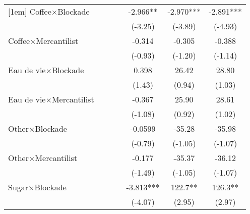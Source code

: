 {\begin{tabular}{l*{6}{c}}
[1em]
Coffee$\times$Blockade&                     &                     &                     &      -2.966** &      -2.970***&      -2.891***\\
                    &                     &                     &                     &     (-3.25)         &     (-3.89)         &     (-4.93)         \\
[1em]
Coffee$\times$Mercantilist&                     &                     &                     &      -0.314         &      -0.305         &      -0.388         \\
                    &                     &                     &                     &     (-0.93)         &     (-1.20)         &     (-1.14)         \\
[1em]
Eau de vie$\times$Blockade&                     &                     &                     &       0.398         &       26.42         &       28.80         \\
                    &                     &                     &                     &      (1.43)         &      (0.94)         &      (1.03)         \\
[1em]
Eau de vie$\times$Mercantilist&                     &                     &                     &      -0.367         &       25.90         &       28.61         \\
                    &                     &                     &                     &     (-1.08)         &      (0.92)         &      (1.02)         \\
[1em]
Other$\times$Blockade&                     &                     &                     &     -0.0599         &      -35.28         &      -35.98         \\
                    &                     &                     &                     &     (-0.79)         &     (-1.05)         &     (-1.07)         \\
[1em]
Other$\times$Mercantilist&                     &                     &                     &      -0.177         &      -35.37         &      -36.12         \\
                    &                     &                     &                     &     (-1.49)         &     (-1.05)         &     (-1.07)         \\
[1em]
Sugar$\times$Blockade&                     &                     &                     &      -3.813***&       122.7** &       126.3** \\
                    &                     &                     &                     &     (-4.07)         &      (2.95)         &      (2.97)         \\

\end{tabular}}
